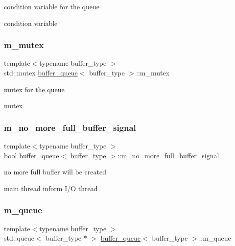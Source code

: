 condition variable for the queue 

condition variable \mbox{\label{structbuffer__queue_aa554ca5c5cccd9b58ddad9d25fa7f7e8}} 
\subsubsection{\texorpdfstring{m\+\_\+mutex}{m\_mutex}}
{\footnotesize\ttfamily template$<$typename buffer\+\_\+type $>$ \\
std\+::mutex \hyperlink{structbuffer__queue}{buffer\+\_\+queue}$<$ buffer\+\_\+type $>$\+::m\+\_\+mutex}



mutex for the queue 

mutex \mbox{\label{structbuffer__queue_abcecda21a70871516c9322a4b4f3c6bd}} 
\subsubsection{\texorpdfstring{m\+\_\+no\+\_\+more\+\_\+full\+\_\+buffer\+\_\+signal}{m\_no\_more\_full\_buffer\_signal}}
{\footnotesize\ttfamily template$<$typename buffer\+\_\+type $>$ \\
bool \hyperlink{structbuffer__queue}{buffer\+\_\+queue}$<$ buffer\+\_\+type $>$\+::m\+\_\+no\+\_\+more\+\_\+full\+\_\+buffer\+\_\+signal}



no more full buffer will be created 

main thread inform I/O thread \mbox{\label{structbuffer__queue_abac5a752d815ded66d3ab87b5b6649b6}} 
\subsubsection{\texorpdfstring{m\+\_\+queue}{m\_queue}}
{\footnotesize\ttfamily template$<$typename buffer\+\_\+type $>$ \\
std\+::queue$<$ buffer\+\_\+type $\ast$ $>$ \hyperlink{structbuffer__queue}{buffer\+\_\+queue}$<$ buffer\+\_\+type $>$\+::m\+\_\+queue}



